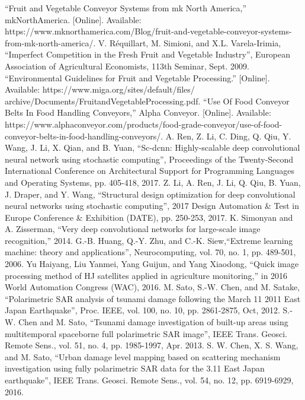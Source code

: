 \documentclass[conference]{IEEEtran}
\begin{document}
	\begin{thebibliography}{00}
		 ``Fruit and Vegetable Conveyor Systems from mk North America,'' mkNorthAmerica. [Online]. Available: https://www.mknorthamerica.com/Blog/fruit-and-vegetable-conveyor-systems-from-mk-north-america/.
		 V. Réquillart, M. Simioni, and X.L. Varela-Irimia, ``Imperfect Competition in the Fresh Fruit and Vegetable Industry'', European Association of Agricultural Economists, 113th Seminar, Sept. 2009.
		 ``Environmental Guidelines for Fruit and Vegetable Processing.'' [Online]. Available: https://www.miga.org/sites/default/files/ archive/Documents/FruitandVegetableProcessing.pdf.
		 ``Use Of Food Conveyor Belts In Food Handling Conveyors,'' Alpha Conveyor. [Online]. Available: https://www.alphaconveyor.com/products/food-grade-conveyor/use-of-food-conveyor-belts-in-food-handling-conveyors/.
		 A. Ren, Z. Li, C. Ding, Q. Qiu, Y. Wang, J. Li, X. Qian, and B. Yuan, ``Sc-dcnn: Highly-scalable deep convolutional neural network using stochastic computing'', Proceedings of the Twenty-Second International Conference on Architectural Support for Programming Languages and Operating Systems, pp. 405-418, 2017.
		 Z. Li, A. Ren, J. Li, Q. Qiu, B. Yuan, J. Draper, and Y. Wang, ``Structural design optimization for deep convolutional neural networks using stochastic computing'', 2017 Design Automation \& Test in Europe Conference \& Exhibition (DATE), pp. 250-253, 2017.
		 K. Simonyan and A. Zisserman, ``Very deep convolutional networks for large-scale image recognition,'' 2014.
		 G.-B. Huang, Q.-Y. Zhu, and C.-K. Siew,``Extreme learning machine: theory and applications'', Neurocomputing, vol. 70, no. 1, pp. 489-501, 2006.
		 Yu Haiyang, Liu Yanmei, Yang Guijun, and Yang Xiaodong, ``Quick image processing method of HJ satellites applied in agriculture monitoring,'' in 2016 World Automation Congress (WAC), 2016.
		 M. Sato, S.-W. Chen, and M. Satake, ``Polarimetric SAR analysis of tsunami damage following the March 11 2011 East Japan Earthquake'', Proc. IEEE, vol. 100, no. 10, pp. 2861-2875, Oct, 2012.
		 S.-W. Chen and M. Sato, ``Tsunami damage investigation of built-up areas using multitemporal spaceborne full polarimetric SAR image'', IEEE Trans. Geosci. Remote Sens., vol. 51, no. 4, pp. 1985-1997, Apr. 2013.
		 S. W. Chen, X. S. Wang, and M. Sato, ``Urban damage level mapping based on scattering mechanism investigation using fully polarimetric SAR data for the 3.11 East Japan earthquake'', IEEE Trans. Geosci. Remote Sens., vol. 54, no. 12, pp. 6919-6929, 2016.

\end{thebibliography}
\end{document}
